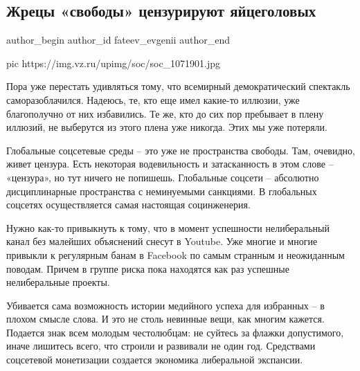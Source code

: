  
 
 
 
 
 
\subsection{Жрецы «свободы» цензурируют яйцеголовых}
\label{sec:23_11_2020.news.ru.vz.fateev_evgenii.1.mysli_svoboda_cenzura}
\ifcmt
	author_begin
   author_id fateev_evgenii
	author_end
\fi


\ifcmt
pic https://img.vz.ru/upimg/soc/soc_1071901.jpg
\fi

Пора уже перестать удивляться тому, что всемирный демократический спектакль
саморазоблачился. Надеюсь, те, кто еще имел какие-то иллюзии, уже благополучно
от них избавились. Те же, кто до сих пор пребывает в плену иллюзий, не
выберутся из этого плена уже никогда. Этих мы уже потеряли.

Глобальные соцсетевые среды – это уже не пространства свободы. Там, очевидно,
живет цензура. Есть некоторая водевильность и затасканность в этом слове –
«цензура», но тут ничего не попишешь. Глобальные соцсети – абсолютно
дисциплинарные пространства с неминуемыми санкциями. В глобальных соцсетях
осуществляется самая настоящая социнженерия.

Нужно как-то привыкнуть к тому, что в момент успешности нелиберальный канал без
малейших объяснений снесут в Youtube. Уже многие и многие привыкли к регулярным
банам в Facebook по самым странным и неожиданным поводам. Причем в группе риска
пока находятся как раз успешные нелиберальные проекты.

Убивается сама возможность истории медийного успеха для избранных – в плохом
смысле слова. И это не столь невинные вещи, как многим кажется. Подается знак
всем молодым честолюбцам: не суйтесь за флажки допустимого, иначе лишитесь
всего, что строили и развивали не один год. Средствами соцсетевой монетизации
создается экономика либеральной экспансии.

